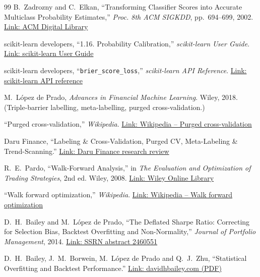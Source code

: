 \documentclass[11pt,a4paper]{article}
\newcommand{\code}[1]{\texttt{#1}}
\begin{document}
\begin{thebibliography}{99}
 B.~Zadrozny and C.~Elkan,
``Transforming Classifier Scores into Accurate Multiclass Probability Estimates,''
\emph{Proc. 8th ACM SIGKDD}, pp.~694--699, 2002.
\href{https://dl.acm.org/doi/10.1145/775047.775151}{Link: ACM Digital Library}

 scikit-learn developers,
``1.16. Probability Calibration,'' \emph{scikit-learn User Guide}.
\href{https://scikit-learn.org/stable/modules/calibration.html}{Link: scikit-learn User Guide}

 scikit-learn developers, ``\code{brier\_score\_loss},''
\emph{scikit-learn API Reference}.
\href{https://scikit-learn.org/stable/modules/generated/sklearn.metrics.brier_score_loss.html}{Link: scikit-learn API reference}

 M.~L\'opez de Prado,
\emph{Advances in Financial Machine Learning}. Wiley, 2018.
(Triple-barrier labelling, meta-labelling, purged cross-validation.)

 ``Purged cross-validation,'' \emph{Wikipedia}.
\href{https://en.wikipedia.org/wiki/Purged_cross-validation}{Link: Wikipedia -- Purged cross-validation}

 Daru Finance, ``Labeling \& Cross-Validation, Purged CV,
Meta-Labeling \& Trend-Scanning.''
\href{https://daru.finance/research-review/lopez-de-prado/labeling-and-cross-validation}{Link: Daru Finance research review}

 R.~E.~Pardo, ``Walk-Forward Analysis,'' in
\emph{The Evaluation and Optimization of Trading Strategies}, 2nd ed. Wiley, 2008.
\href{https://onlinelibrary.wiley.com/doi/abs/10.1002/9781119196969.ch11}{Link: Wiley Online Library}

 ``Walk forward optimization,'' \emph{Wikipedia}.
\href{https://en.wikipedia.org/wiki/Walk_forward_optimization}{Link: Wikipedia -- Walk forward optimization}

 D.~H.~Bailey and M.~L\'opez de Prado,
``The Deflated Sharpe Ratio: Correcting for Selection Bias, Backtest Overfitting and
Non-Normality,'' \emph{Journal of Portfolio Management}, 2014.
\href{https://papers.ssrn.com/sol3/papers.cfm?abstract_id=2460551}{Link: SSRN abstract 2460551}

 D.~H.~Bailey, J.~M.~Borwein, M.~L\'opez de Prado and Q.~J.~Zhu,
``Statistical Overfitting and Backtest Performance.''
\href{https://www.davidhbailey.com/dhbpapers/deflated-sharpe.pdf}{Link: davidhbailey.com (PDF)}


\end{thebibliography}
\end{document}
